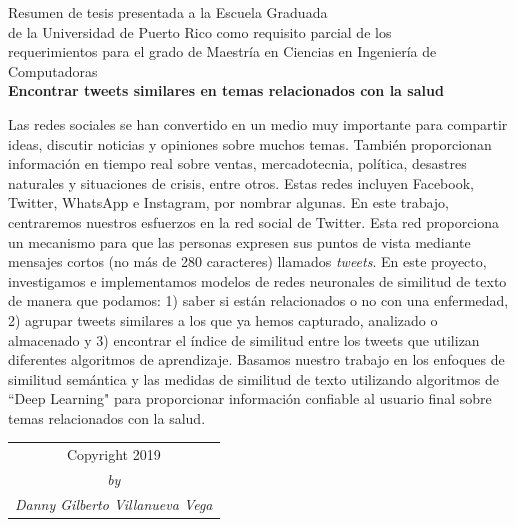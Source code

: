 \documentclass[12pt]{report}
\begin{document}
	\begin{center}
		Resumen de tesis presentada a la Escuela Graduada\\
		de la Universidad de Puerto Rico como requisito parcial de los\\
		requerimientos para el grado de Maestr\'ia en Ciencias en Ingenier\'ia de Computadoras\\
		
		\vspace{.1cm}
		\large\textbf {Encontrar tweets similares en temas relacionados con la salud}
	\end{center}
	\doublespacing
Las redes sociales se han convertido en un medio muy importante para compartir ideas, discutir noticias y opiniones sobre muchos temas. Tambi\'en proporcionan informaci\'on en tiempo real sobre ventas, mercadotecnia, pol\'itica, desastres naturales y situaciones de crisis, entre otros. Estas redes incluyen Facebook, Twitter, WhatsApp e Instagram, por nombrar algunas. En este trabajo, centraremos nuestros esfuerzos en la red social de Twitter. Esta red proporciona un mecanismo para que las personas expresen sus puntos de vista mediante mensajes cortos (no m\'as de 280 caracteres)
llamados {\em tweets}. En este proyecto, investigamos e implementamos modelos de redes neuronales de similitud de texto de manera que podamos: 1) saber si est\'an relacionados o no con una enfermedad, 2) agrupar tweets similares a los que ya hemos capturado, analizado o almacenado y 3) encontrar el \'indice de similitud entre los tweets que utilizan diferentes algoritmos de aprendizaje. Basamos nuestro trabajo en los enfoques de similitud sem\'antica y las medidas de similitud de texto utilizando algoritmos de ``Deep Learning" para proporcionar informaci\'on confiable al usuario final sobre temas relacionados con la salud.

	\par
	\clearpage
	
	\vspace*{\fill}
	\begin{table}[H]
		\centering
		\begin{adjustbox}{max width=\textwidth }
			\begin{tabular}{c}
				Copyright \textcopyright\hspace{0.15cm}2019 \\
				\textit{by}\\
				\textit{Danny Gilberto Villanueva Vega}\\
			\end{tabular}
		\end{adjustbox} 
	\end{table}
	\vfill
	\clearpage
	
\end{document}
